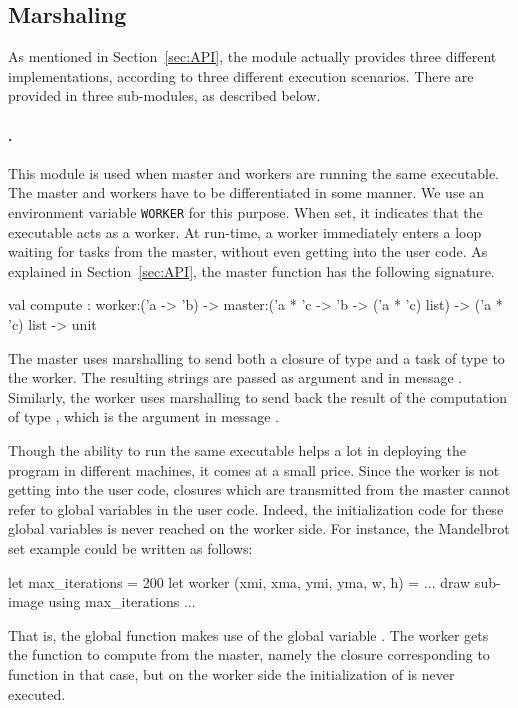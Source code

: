\documentclass[tfpsymp,pagenumbers]{tfp07symp}
\begin{document}
\subsection{Marshaling}

  As mentioned in Section~\ref{sec:API}, the  module
  actually provides three different implementations, according to
  three different execution scenarios. There are provided in three
  sub-modules, as described below.

  \paragraph{.} This module is used when master and workers
  are running the same executable. The master and workers have to be
  differentiated in some manner. We use an environment variable
  \texttt{WORKER} for this purpose. When set, it indicates that the
  executable acts as a worker. At run-time, a worker immediately
  enters a loop waiting for tasks from the master, without even
  getting into the user code.  As explained in Section~\ref{sec:API},
  the master function has the following signature.
  \begin{ocaml}
    val compute : worker:('a -> 'b) -> master:('a * 'c -> 'b -> ('a *
    'c) list) -> ('a * 'c) list -> unit
  \end{ocaml}
  The master uses marshalling to send both a closure of type  and a task of type  to the worker. The resulting
  strings are passed as argument  and  in message
  . Similarly, the worker uses marshalling to send back the
  result of the computation of type , which is the argument
   in message .

  Though the ability to run the same executable helps a lot in
  deploying the program in different machines, it comes at a small
  price. Since the worker is not getting into the user code, closures
  which are transmitted from the master cannot refer to global
  variables in the user code. Indeed, the initialization code for
  these global variables is never reached on the worker side. For
  instance, the Mandelbrot set example could be written as follows:
  \begin{ocaml}
    let max_iterations = 200 let worker (xmi, xma, ymi, yma, w, h) =
    ... draw sub-image using max_iterations ...
  \end{ocaml}
  That is, the global function  makes use of the global
  variable . The worker gets the function to
  compute from the master, namely the closure corresponding to
  function  in that case, but on the worker side the
  initialization of  is never executed.
\end{document}
